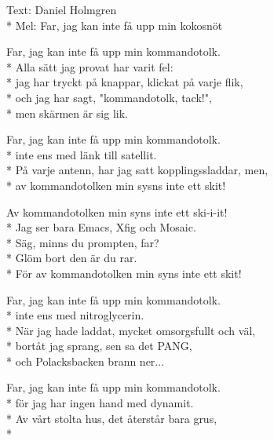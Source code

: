 \begin{SongText}[Kommandotolken]
    \begin{SongInfo}
        Text: Daniel Holmgren\\*%
        Mel: Far, jag kan inte få upp min kokosnöt
    \end{SongInfo}
    \begin{Verse}
        Far, jag kan inte få upp min kommandotolk.\\*%
        Alla sätt jag provat har varit fel:\\*%
        jag har tryckt på knappar, klickat på varje flik,\\*%
        och jag har sagt, "kommandotolk, tack!",\\*%
        men skärmen är sig lik.
    \end{Verse}
    \begin{Verse}
        Far, jag kan inte få upp min kommandotolk.\\*%
        inte ens med länk till satellit.\\*%
        På varje antenn, har jag satt kopplingssladdar, men,\\*%
        av kommandotolken min sysns inte ett skit!
    \end{Verse}
    \begin{Verse}
        Av kommandotolken min syns inte ett ski-i-it!\\*%
        Jag ser bara Emacs, Xfig och Mosaic.\\*%
        Säg, minns du prompten, far?\\*%
        Glöm bort den är du rar.\\*%
        För av kommandotolken min syns inte ett skit!
    \end{Verse}
    \begin{Verse}
        Far, jag kan inte få upp min kommandotolk.\\*%
        inte ens med nitroglycerin.\\*%
        När jag hade laddat, mycket omsorgsfullt och väl,\\*%
        bortåt jag sprang, sen sa det PANG,\\*%
        och Polacksbacken brann ner...
    \end{Verse}
    \begin{Verse}
        Far, jag kan inte få upp min kommandotolk.\\*%
        för jag har ingen hand med dynamit.\\*%
        Av vårt stolta hus, det återstår bara grus,\\*%

\end{Verse}
\end{SongText}
